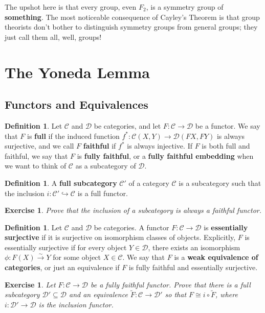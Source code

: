 \documentclass[11pt]{article}
\theoremstyle{plain}
\newtheorem{exrc}[thm]{Exercise}
\theoremstyle{definition}
\newtheorem{defn}[thm]{Definition}
\newcommand{\s}[1]{\mathcal{#1}}
\begin{document}
The upshot here is that every group, even $F_2$, is a symmetry group of \textbf{something}. The most noticeable consequence of Cayley's Theorem is that group theorists don't bother to distinguish symmetry groups from general groups; they just call them all, well, groups!

\section{The Yoneda Lemma}
\subsection{Functors and Equivalences}
\begin{defn}
    Let $\s{C}$ and $\s D$ be categories, and let $F : \s{C} \to \s D$ be a functor. We say that $F$ is \textbf{full} if the induced function $f^* : \s{C}(X,Y) \to \s D(FX,FY)$ is always surjective, and we call $F$ \textbf{faithful} if $f^*$ is always injective. If $F$ is both full and faithful, we say that $F$ is \textbf{fully faithful}, or a \textbf{fully faithful embedding} when we want to think of $\s C$ as a subcategory of $\s D$.
\end{defn}

\begin{defn}
    A \textbf{full subcategory} $\s{C}'$ of a category $\s{C}$ is a subcategory such that the inclusion $i : \s{C}' \hookrightarrow \s{C}$ is a full functor.
\end{defn}

\begin{exrc}
    Prove that the inclusion of a subcategory is always a faithful functor.
\end{exrc}

\begin{defn}
    Let $\s{C}$ and $\s D$ be categories. A functor $F : \s{C} \to \s D$ is \textbf{essentially surjective} if it is surjective on isomorphism classes of objects. Explicitly, $F$ is essentially surjective if for every object $Y \in \s D$, there exists an isomorphism $\phi : F(X) \xrightarrow{\sim} Y$ for some object $X \in \s{C}$. We say that $F$ is a \textbf{weak equivalence of categories}, or just an equivalence if $F$ is fully faithful and essentially surjective.
\end{defn}

\begin{exrc}
    Let $F : \s{C} \to \s D$ be a fully faithful functor. Prove that there is a full subcategory $\s{D}' \subseteq \s{D}$ and an equivalence $\widetilde{F} : \s{C} \to \s D'$ so that $F \cong i \circ \widetilde{F}$, where $i : \s D' \to \s D$ is the inclusion functor.
\end{exrc}
\end{document}
